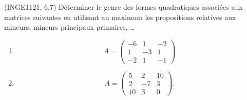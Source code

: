 

\begin{exercice}\label{exoINGE1121La0019}

	(INGE1121, 6.7) Déterminer le genre des formes quadratiques associées aux matrices suivantes en utilisant au maximum les propositions relatives aux mineurs, mineurs principaux primaires, \ldots

	\begin{multicols}{2}
		\begin{enumerate}
			\item
				\begin{equation}
					A=\begin{pmatrix}
						-6	&	1	&	-2	\\
						1	&	-3	&	1	\\
						-2	&	1	&	-1
					\end{pmatrix}
				\end{equation}
			\item
				\begin{equation}
					A=\begin{pmatrix}
						5	&	2	&	10	\\
						2	&	-7	&	3	\\
						10	&	3	&	0
					\end{pmatrix}.
				\end{equation}
				
		\end{enumerate}
	\end{multicols}
	

\end{exercice}
